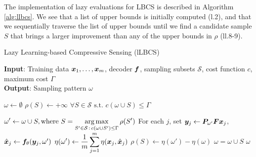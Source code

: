 The implementation of lazy evaluations for LBCS is described in Algorithm \ref{alg:llbcs}. We see that a list of upper bounds is initially computed (l.2), and that we sequentially traverse the list of upper bounds until we find a candidate sample $S$ that brings a larger improvement than any of the upper bounds in $\rho$ (ll.8-9). 


\begin{algorithm}
    \begin{minipage}[b]{.8\textwidth}
    \caption{Lazy Learning-based Compressive Sensing (lLBCS)}
    \label{alg:llbcs}
    \textbf{Input}: Training data ${\bm{x}}_1, \dotsc, {\bm{x}}_m$, decoder ${\bm{f}}$, sampling subsets $\mathcal{S}$, cost function $c$, maximum cost $\Gamma$ \\
    \textbf{Output}: Sampling pattern $\omega$
    \begin{algorithmic}[1]
    \State $\omega \leftarrow \emptyset$
    \State $\rho(S) \leftarrow +\infty \text{~}\forall S \in \mathcal S \text{ s.t. } c(\omega \cup S) \le \Gamma$
    
         \State $\displaystyle\omega' \leftarrow \omega \cup S, \text{where } S = \operatorname*{arg\,max}_{S' \in \mathcal S\,:\,c(\omega \cup S') \le \Gamma} \rho(S')$	 
            \State For each $j$, set  ${\bm{y}}_{j} \leftarrow {\bm{P}}_{\omega'}{\bm{F}}{\bm{x}}_j$, $\hat{{\bm{x}}}_j \leftarrow {\bm{f}}_\theta({\bm{y}}_j,\omega')$ 
            \State $\displaystyle\eta(\omega') \leftarrow \frac{1}{m}\sum_{j=1}^m \eta({\bm{x}}_j,\hat{{\bm{x}}}_j)$
            \State $\displaystyle\rho(S) \leftarrow \eta(\omega') - \eta(\omega)$
        \State $\omega = \omega \cup S$
        \EndIf 
     \EndWhile
      $\omega$
    \end{algorithmic}
    \end{minipage}
    \end{algorithm}


